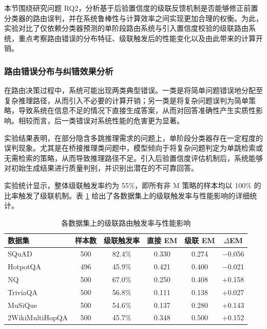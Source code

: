 本节围绕研究问题 RQ2，分析基于后验置信度的级联反馈机制是否能够修正前置分类器的路由误判，并在系统鲁棒性与计算效率之间实现更加合理的权衡。为此，实验对比了仅依赖分类器预测的单阶段路由系统与引入置信度校验的级联路由系统，重点考察路由错误的分布特征、级联触发后的性能变化以及由此带来的计算开销。

\subsubsection{路由错误分布与纠错效果分析}

在路由决策过程中，系统可能出现两类典型错误。一类是将简单问题错误地分配至复杂推理路径，从而引入不必要的计算开销；另一类是将复杂问题误判为简单策略，导致系统在信息不足的情况下直接生成答案，从而对回答准确性产生实质性影响。相较而言，后一类错误对系统性能的危害更为显著。

实验结果表明，在部分隐含多跳推理需求的问题上，单阶段分类器存在一定程度的误判现象。尤其是在桥接推理类问题中，模型倾向于将复杂问题判定为单跳检索或无需检索的策略，从而导致推理路径不足。引入后验置信度评估机制后，系统能够对初始生成结果进行质量判别，并识别出潜在的不可靠回答。

实验统计显示，整体级联触发率约为 55\%，即所有非 M 策略的样本均以 100\% 的比率触发了级联机制。表 \ref{tab:cascade_per_dataset} 给出了各数据集上的级联触发率与性能影响的详细统计。

\begin{table}[htbp]
    \centering
    \caption{各数据集上的级联路由触发率与性能影响}
    \label{tab:cascade_per_dataset}
    \renewcommand{\arraystretch}{1.3}
    \begin{tabular}{l c c c c c}
        \toprule
        \textbf{数据集} & \textbf{样本数} & \textbf{级联触发率} & \textbf{直接 EM} & \textbf{级联 EM} & \textbf{$\Delta$EM} \\
        \midrule
        SQuAD & 500 & 82.4\% & 0.330 & 0.274 & $-$0.056 \\
        HotpotQA & 496 & 45.9\% & 0.421 & 0.400 & $-$0.021 \\
        NQ & 500 & 67.0\% & 0.250 & 0.408 & +0.158 \\
        TriviaQA & 500 & 56.8\% & 0.111 & 0.138 & +0.027 \\
        MuSiQue & 500 & 54.6\% & 0.137 & 0.280 & +0.143 \\
        2WikiMultiHopQA & 500 & 45.7\% & 0.348 & 0.500 & +0.152 \\
        \bottomrule
    \end{tabular}
\end{table}

